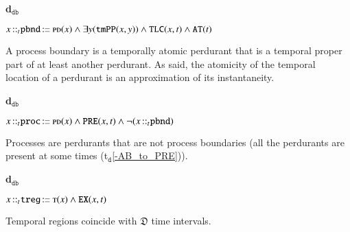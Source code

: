\documentclass[ao]{iosart2x}
\newcommand{\dolceAxLabel}{\textrm{a$_\texttt{d}$}}
\newcommand{\dolceThrLabel}{\textrm{t$_\texttt{d}$}}
\newcommand{\dbDefLabel}{\textrm{d$_\texttt{db}$}}
\newcounter{cntdbdf}
\newcommand{\dbdf}[1]{\refstepcounter{cntdbdf}\begin{small}{\bf \dbDefLabel\thecntdbdf\label{#1}}\end{small}}
\newcommand{\refdolceax}[1]{({\dolceAxLabel}\ref{#1})}
\newcommand{\refdolceth}[1]{({\dolceThrLabel}\ref{#1})}
\newcommand{\pr}[1]{\mathtt{#1}}
\newcommand{\cn}[1]{\mathtt{#1}}
\newcommand\textequal{%
 \rule[.08ex]{5pt}{0.35pt}\llap{\rule[.78ex]{5pt}{0.35pt}}}
\newcommand{\sdef}{{\hspace{1.5pt}:\hspace{-2.5pt}\textequal\hspace{3pt}}}
\newcommand {\thdolce} {\ensuremath{\mathfrak{D}}}
\newcommand {\ABdcat} {\textsc{ab}}
\newcommand {\PDdcat} {\textsc{pd}}
\newcommand {\Tdcat} {\textsc{t}}
\newcommand {\PPd} {\ensuremath{\pr{PP}}}
\newcommand {\ATd} {\ensuremath{\pr{AT}}}
\newcommand {\PREd} {\ensuremath{\pr{PRE}}}
\newcommand {\TLCd} {\ensuremath{\pr{TLC}}}
\newcommand{\procbcat}{\cn{proc}}
\newcommand{\pbndbcat}{\cn{pbnd}}
\newcommand{\tregbcat}{\cn{treg}}
\newcommand{\bfotppart}{\pr{tmPP}}
\newcommand{\bfoexist}{\pr{EX}}
\newcommand{\bfoiof}[1]{{\,::_{#1\:\!}}}
\newcommand{\bfotregof}{\pr{TREG}}
\begin{document}
%
 
\item[\dbdf{d2b_pbnd}] $x \bfoiof{t} \pbndbcat \sdef \PDdcat(x) \land \exists y(\bfotppart(x,y)) \land \TLCd(x,t) \land \ATd(t)$

\vspace{1pt}
A process boundary is a temporally atomic perdurant that is a temporal proper part of at least another perdurant. As said, the atomicity of the temporal location of a perdurant is an approximation of its instantaneity. 

%
%
%

\item[\dbdf{d2b_proc}] $x \bfoiof{t} \procbcat \sdef \PDdcat(x) \land \PREd(x,t) \land \neg(x \bfoiof{t} \pbndbcat)$

\vspace{1pt}
Processes are perdurants that are not process boundaries (all the perdurants are present at some times \refdolceth{-AB_to_PRE}).

%

\item[\dbdf{d2b_treg}] $x \bfoiof{t} \tregbcat \sdef \Tdcat(x) \land \bfoexist(x,t)$

\vspace{1pt}
Temporal regions coincide with $\thdolce$ time intervals.
\end{document}
